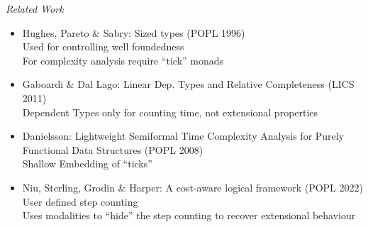 \documentclass[xetex,serif,mathserif,aspectratio=169]{beamer}
\begin{document}
\begin{frame}
  {\it Related Work}

  \bigskip

  \begin{itemize}
  \item Hughes, Pareto \& Sabry: Sized types (POPL 1996) \\
    \textcolor{black!60}{Used for controlling well foundedness} \\
    \textcolor{black!60}{For complexity analysis require ``tick'' monads} \\
  \item Gaboardi \& Dal Lago: Linear Dep. Types and Relative Completeness (LICS 2011) \\
    \textcolor{black!60}{Dependent Types only for counting time, not extensional properties}
  \item Danielsson: Lightweight Semiformal Time Complexity Analysis for Purely Functional Data Structures (POPL 2008) \\
    \textcolor{black!60}{Shallow Embedding of ``ticks''}
  \item Niu, Sterling, Grodin \& Harper: A cost-aware logical framework (POPL 2022)\\
    \textcolor{black!60}{User defined step counting} \\
    \textcolor{black!60}{Uses modalities to ``hide'' the step counting to recover extensional behaviour}
  \end{itemize}

\end{frame}
\end{document}
